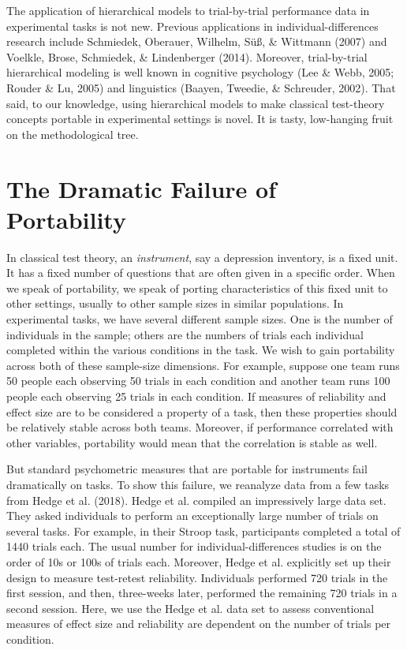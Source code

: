 \documentclass[english,man]{apa6}
\theoremstyle{definition}
\theoremstyle{definition}
\theoremstyle{remark}
\begin{document}
The application of hierarchical models to trial-by-trial performance
data in experimental tasks is not new. Previous applications in
individual-differences research include Schmiedek, Oberauer, Wilhelm,
Süß, \& Wittmann (2007) and Voelkle, Brose, Schmiedek, \& Lindenberger
(2014). Moreover, trial-by-trial hierarchical modeling is well known in
cognitive psychology (Lee \& Webb, 2005; Rouder \& Lu, 2005) and
linguistics (Baayen, Tweedie, \& Schreuder, 2002). That said, to our
knowledge, using hierarchical models to make classical test-theory
concepts portable in experimental settings is novel. It is tasty,
low-hanging fruit on the methodological tree.

\section{The Dramatic Failure of
Portability}\label{the-dramatic-failure-of-portability}

In classical test theory, an \emph{instrument}, say a depression
inventory, is a fixed unit. It has a fixed number of questions that are
often given in a specific order. When we speak of portability, we speak
of porting characteristics of this fixed unit to other settings, usually
to other sample sizes in similar populations. In experimental tasks, we
have several different sample sizes. One is the number of individuals in
the sample; others are the numbers of trials each individual completed
within the various conditions in the task. We wish to gain portability
across both of these sample-size dimensions. For example, suppose one
team runs 50 people each observing 50 trials in each condition and
another team runs 100 people each observing 25 trials in each condition.
If measures of reliability and effect size are to be considered a
property of a task, then these properties should be relatively stable
across both teams. Moreover, if performance correlated with other
variables, portability would mean that the correlation is stable as
well.

But standard psychometric measures that are portable for instruments
fail dramatically on tasks. To show this failure, we reanalyze data from
a few tasks from Hedge et al. (2018). Hedge et al. compiled an
impressively large data set. They asked individuals to perform an
exceptionally large number of trials on several tasks. For example, in
their Stroop task, participants completed a total of 1440 trials each.
The usual number for individual-differences studies is on the order of
10s or 100s of trials each. Moreover, Hedge et al. explicitly set up
their design to measure test-retest reliability. Individuals performed
720 trials in the first session, and then, three-weeks later, performed
the remaining 720 trials in a second session. Here, we use the Hedge et
al. data set to assess conventional measures of effect size and
reliability are dependent on the number of trials per condition.
\end{document}
